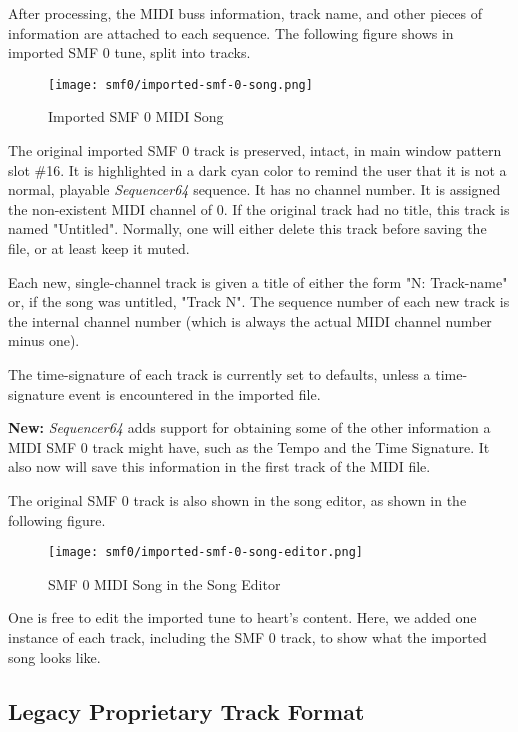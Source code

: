    After processing, the MIDI buss information, track name, and other pieces of
   information are attached to each sequence.  The following figure shows in
   imported SMF 0 tune, split into tracks.

\begin{figure}[H]
   \centering 
   \texttt{[image: smf0/imported-smf-0-song.png]}
   \caption{Imported SMF 0 MIDI Song}
   \label{fig:imported_smf_0_song}
\end{figure}

   The original imported SMF 0 track is preserved, intact, in main window
   pattern slot \#16.  It is highlighted in a dark cyan color to remind the
   user that it is not a normal, playable \textsl{Sequencer64} 
   sequence.  It has no channel number.  It is
   assigned the non-existent MIDI channel of 0.  If the original track had no
   title, this track is named "Untitled".  Normally, one will either delete
   this track before saving the file, or at least keep it muted.

   Each new, single-channel track is given a title of either the form
   "N: Track-name" or, if the song was untitled, "Track N".
   The sequence number of each new track is the internal channel number (which
   is always the actual MIDI channel number minus one).

   The time-signature of each track is currently set to defaults, unless a
   time-signature event is encountered in the imported file.

   \textbf{New:}
   \textsl{Sequencer64} adds support for obtaining some of the other
   information a MIDI SMF 0 track might have, such as the Tempo and the
   Time Signature.  It also now will save this information in the first track
   of the MIDI file.

   The original SMF 0 track is also shown in the song editor, as shown in the
   following figure.

\begin{figure}[H]
   \centering 
   \texttt{[image: smf0/imported-smf-0-song-editor.png]}
   \caption{SMF 0 MIDI Song in the Song Editor}
   \label{fig:imported_smf_0_song_editor}
\end{figure}

   One is free to edit the imported tune to heart's content.
   Here, we added one instance of each track, including the SMF 0 track,
   to show what the imported song looks like.

\subsection{Legacy Proprietary Track Format}
\label{subsec:legacy_midi_format}

